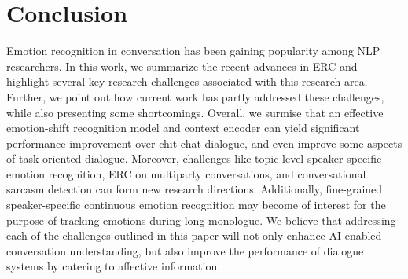 \documentclass{IEEEtran}\usepackage[pdftex]{graphicx}
\begin{document}
	\section{Conclusion}
	\label{sec:conclusion}
	Emotion recognition in conversation has been gaining popularity among NLP researchers.
	In this work, we summarize the recent advances in ERC and highlight several key research challenges associated with this research area.
	Further, we
	point out how current work has partly addressed these challenges, while also presenting some shortcomings. Overall, we surmise that an effective emotion-shift recognition model and context encoder can yield
	significant performance improvement over chit-chat dialogue, and even improve some aspects of task-oriented dialogue. Moreover,  challenges like topic-level speaker-specific emotion recognition, ERC on multiparty conversations, and conversational sarcasm detection
	can form new research directions. Additionally, fine-grained speaker-specific continuous emotion
	recognition may become of interest for the purpose of tracking emotions during long monologue. We believe that addressing each of the challenges outlined in this paper will not only enhance AI-enabled conversation understanding, but also improve the performance of dialogue systems by catering to affective information.
	
	
	
\end{document}
